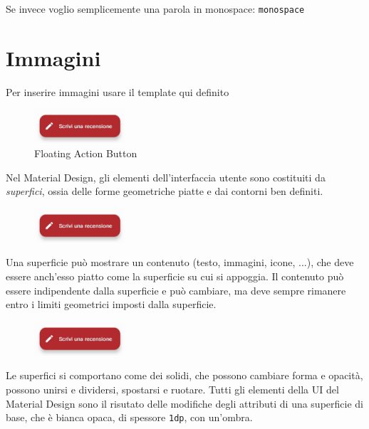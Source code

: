 \documentclass[12pt, a4paper]{report}
\begin{document}
	Se invece voglio semplicemente una parola in monospace: \texttt{monospace}

	\section{Immagini}
	Per inserire immagini usare il template qui definito

		\begin{figure}[h]
   			\centering
   			\includegraphics[width=0.3\textwidth]{elevation} %
 			\caption{Floating Action Button}
    			\label{fig:mesh1} %
		\end{figure}

	Nel Material Design, gli elementi dell'interfaccia utente sono costituiti da \textit{superfici}, ossia delle forme geometriche piatte e dai contorni ben definiti.

		\begin{figure}
   			\centering
   			\includegraphics[width=0.3\textwidth]{elevation} %
		\end{figure}

		Una superficie può mostrare un contenuto (testo, immagini, icone, ...), che deve essere anch'esso piatto come la superficie su cui si appoggia. Il contenuto può essere indipendente dalla superficie e può cambiare, ma deve sempre rimanere entro i limiti geometrici imposti dalla superficie.

		\begin{figure}
   			\centering
   			\includegraphics[width=0.3\textwidth]{elevation} %
		\end{figure}


		Le superfici si comportano come dei solidi, che possono cambiare forma e opacità, possono unirsi e dividersi, spostarsi e ruotare. Tutti gli elementi della UI del Material Design sono il risutato delle modifiche degli attributi di una superficie di base, che è bianca opaca, di spessore \texttt{1dp}, con un'ombra.
\end{document}
